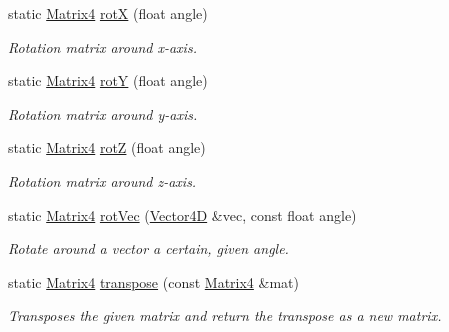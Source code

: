 \begin{DoxyCompactItemize}
\item 
\mbox{\label{class_matrix4_ad0f776311d4fa444adcb5563650bc210}} 
static \mbox{\hyperlink{class_matrix4}{Matrix4}} \mbox{\hyperlink{class_matrix4_ad0f776311d4fa444adcb5563650bc210}{rotX}} (float angle)
\begin{DoxyCompactList}\small\item\em Rotation matrix around x-\/axis. \end{DoxyCompactList}\item 
\mbox{\label{class_matrix4_a0063a003daa39cce2c9fb2693b600093}} 
static \mbox{\hyperlink{class_matrix4}{Matrix4}} \mbox{\hyperlink{class_matrix4_a0063a003daa39cce2c9fb2693b600093}{rotY}} (float angle)
\begin{DoxyCompactList}\small\item\em Rotation matrix around y-\/axis. \end{DoxyCompactList}\item 
\mbox{\label{class_matrix4_aaf387ef01b3ca7897f01a35fffa6c35f}} 
static \mbox{\hyperlink{class_matrix4}{Matrix4}} \mbox{\hyperlink{class_matrix4_aaf387ef01b3ca7897f01a35fffa6c35f}{rotZ}} (float angle)
\begin{DoxyCompactList}\small\item\em Rotation matrix around z-\/axis. \end{DoxyCompactList}\item 
\mbox{\label{class_matrix4_a970a4f16ef00a0893c3f25531522efd3}} 
static \mbox{\hyperlink{class_matrix4}{Matrix4}} \mbox{\hyperlink{class_matrix4_a970a4f16ef00a0893c3f25531522efd3}{rot\+Vec}} (\mbox{\hyperlink{class_vector4_d}{Vector4D}} \&vec, const float angle)
\begin{DoxyCompactList}\small\item\em Rotate around a vector a certain, given angle. \end{DoxyCompactList}\item 
\mbox{\label{class_matrix4_ab970165b164d6bebbafae4004b80f7b3}} 
static \mbox{\hyperlink{class_matrix4}{Matrix4}} \mbox{\hyperlink{class_matrix4_ab970165b164d6bebbafae4004b80f7b3}{transpose}} (const \mbox{\hyperlink{class_matrix4}{Matrix4}} \&mat)
\begin{DoxyCompactList}\small\item\em Transposes the given matrix and return the transpose as a new matrix. \end{DoxyCompactList}\item 

\end{DoxyCompactItemize}
